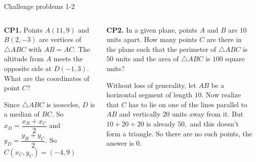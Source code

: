 \documentclass[9pt,aspectratio=169]{beamer}
\begin{document}
\begin{frame}{Challenge problems 1-2}
  \begin{columns}[T]
    \begin{column}{0.5\textwidth}
      \begin{problem}
        \textbf{CP1.} Points $A(11, 9)$ and $B(2, -3)$ are vertices of $\triangle ABC$ with $AB=AC$. The altitude from $A$ meets the opposite side at $D(-1, 3)$. What are the coordinates of point $C$?
      \end{problem}
      Since $\triangle ABC$ is isosceles, $D$ is a median of $BC$. So $x_D = \dfrac{x_B + x_C}{2}$ and $y_D = \dfrac{y_B + y_C}{2}$. So $C(x_C, y_C) = \boxed{(-4, 9)}$
    \end{column}
    \begin{column}{0.5\textwidth}
      \begin{problem}
        \textbf{CP2.} In a given plane, points $A$ and $B$ are $10$ units apart. How many points $C$ are there in the plane such that the perimeter of $\triangle ABC$ is $50$ units and the area of $\triangle ABC$ is $100$ square units?
      \end{problem}

      Without loss of generality, let $AB$ be a horizontal segment of length $10$. Now realize that $C$ has to lie on one of the lines parallel to $AB$ and vertically $20$ units away from it. But $10+20+20$ is already $50,$ and this doesn't form a triangle. So there are no such points, the answer is $\boxed{0}$.
    \end{column}
  \end{columns}
\end{frame}
\end{document}
